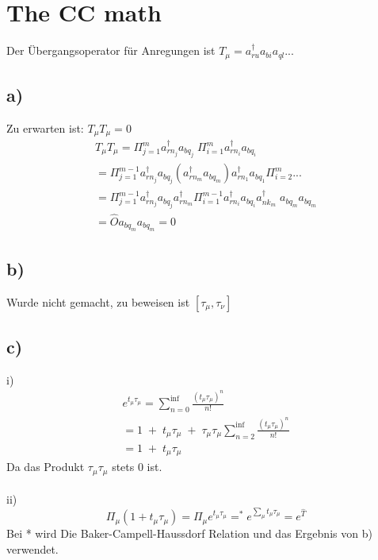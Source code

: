 \section{The CC math}

Der \"Ubergangsoperator f\"ur Anregungen ist $T_{\mu} = a_{ru}^{\dagger} a_{bi} a_{ql} ...$

\subsection{a)}

Zu erwarten ist: $T_{\mu}T_{\mu} = 0$\\
\begin{align}
T_{\mu}T_{\mu} = \Pi_{j=1}^{m} a_{rn_j}^{\dagger} a_{bq_j} \; \Pi_{i=1}^{m} a_{rn_i}^{\dagger} a_{bq_i} \\
= \Pi_{j=1}^{m-1} a_{rn_j}^{\dagger} a_{bq_j} \left( a_{rn_m}^{\dagger} a_{bq_m} \right) a_{rn_1}^{\dagger} a_{bq_1} \Pi_{i=2}^{m} ... \\
= \Pi_{j=1}^{m-1} a_{rn_j}^{\dagger} a_{bq_j} a_{rn_m}^{\dagger} \Pi_{i=1}^{m-1} a_{rn_i}^{\dagger} a_{bq_i} a_{nk_m}^{\dagger} \; a_{bq_m} a_{bq_m} \\
= \hat{O} a_{bq_m} a_{bq_m} = 0
\end{align}

\subsection{b)}

Wurde nicht gemacht, zu beweisen ist $\left[ \tau_{\mu} , \tau_{\nu} \right]$

\subsection{c)}

i)
\begin{align}
e^{t_{\mu} \tau_{\mu}} = \sum_{n=0}^{\inf} \frac{\left(t_{\mu} \tau_{\mu} \right)^n}{n!} \\
= 1 \; + \; t_{\mu} \tau_{\mu} \; + \; \tau_{\mu} \tau_{\mu} \sum_{n=2}^{\inf} \frac{\left(t_{\mu} \tau_{\mu} \right)^n}{n!} \\
= 1 \; + \; t_{\mu} \tau_{\mu}
\end{align}
Da das Produkt $\tau_{\mu} \tau_{\mu}$ stets 0 ist.\\
\\
ii)
\begin{equation}
\Pi_{\mu} \left(1 + t_{\mu} \tau_{\mu} \right) = \Pi_{\mu} e^{t_{\mu} \tau_{\mu}} =^* e^{\sum_{\mu} t_{\mu} \tau_{\mu}} = e^{\hat{T}}
\end{equation}
Bei * wird Die Baker-Campell-Haussdorf Relation und das Ergebnis von b) verwendet.


